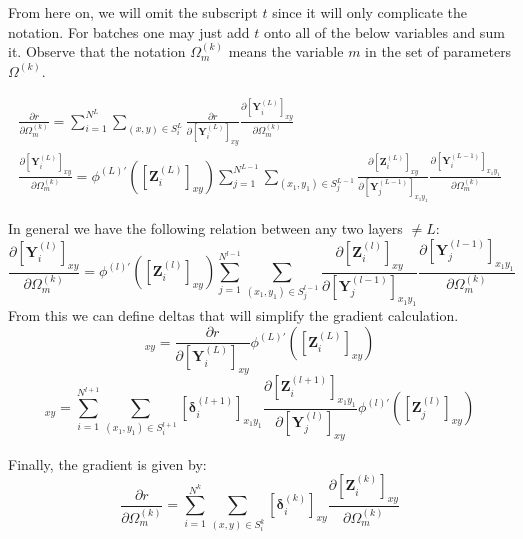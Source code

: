 \documentclass[a4paper,10pt]{article}
\theoremstyle{definition}
\begin{document}
From here on, we will omit the subscript $t$ since it will only complicate the notation. For batches one may just add $t$ onto all of the below variables and sum it. Observe that the notation $\Omega^{(k)}_m$ means the variable $m$ in the set of parameters $\Omega^{(k)}$.

\begin{gather}
\frac{\partial r}{\partial \Omega^{(k)}_m} = \sum_{i = 1}^{N^L}\sum_{(x,y) \in S^L_i} \frac{\partial r}{\partial [\pmb{Y}^{(L)}_i]_{xy}} \frac{\partial [\pmb{Y}^{(L)}_i]_{xy}}{\partial \Omega^{(k)}_m} \\
\frac{\partial [\pmb{Y}^{(L)}_i]_{xy}}{\partial \Omega^{(k)}_m} = \phi^{(L)'}([\pmb{Z}^{(L)}_{i}]_{xy}) \sum_{j = 1}^{N^{L-1}}\sum_{(x_1,y_1) \in S^{L-1}_j}\frac{\partial [\pmb{Z}^{(L)}_{i}]_{xy}}{\partial [\pmb{Y}^{(L-1)}_j]_{x_1y_1}}\frac{\partial [\pmb{Y}^{(L-1)}_i]_{x_1y_1}}{\partial \Omega^{(k)}_m}
\end{gather}

In general we have the following relation between any two layers $\neq L$:
\begin{equation}
\frac{\partial [\pmb{Y}^{(l)}_i]_{xy}}{\partial \Omega^{(k)}_m} = \phi^{(l)'}([\pmb{Z}^{(l)}_{i}]_{xy}) \sum_{j = 1}^{N^{l-1}}\sum_{(x_1,y_1) \in S^{l-1}_j}\frac{\partial [\pmb{Z}^{(l)}_{i}]_{xy}}{\partial [\pmb{Y}^{(l-1)}_j]_{x_1y_1}}\frac{\partial [\pmb{Y}^{(l-1)}_j]_{x_1y_1}}{\partial \Omega^{(k)}_m}
\end{equation}
From this we can define deltas that will simplify the gradient calculation.
\begin{equation}
[\pmb{\delta}_i^{(L)}]_{xy} = \frac{\partial r}{\partial [\pmb{Y}^{(L)}_i]_{xy}}\phi^{(L)'}([\pmb{Z}^{(L)}_{i}]_{xy})
\label{eq:fundamentalDeltaL}
\end{equation}
\begin{equation}
[\pmb{\delta}_j^{(l)}]_{xy} = \sum_{i = 1}^{N^{l+1}}\sum_{(x_1,y_1) \in S^{l+1}_i} [\pmb{\delta}^{(l+1)}_i]_{x_1y_1} \frac{\partial [\pmb{Z}^{(l + 1)}_{i}]_{x_1y_1}}{\partial [\pmb{Y}^{(l)}_j]_{xy}} \phi^{(l)'}([\pmb{Z}^{(l)}_{j}]_{xy})
\label{eq:fundamentalDelta}
\end{equation}

Finally, the gradient is given by:
\begin{equation}
\frac{\partial r}{\partial \Omega^{(k)}_m} = \sum_{i = 1}^{N^{k}}\sum_{(x,y) \in S^{k}_i} [\pmb{\delta}_i^{(k)}]_{xy} \frac{\partial [\pmb{Z}^{(k)}_i]_{xy}}{\partial \Omega^{(k)}_m}
\label{eq:fundamentalWeight}
\end{equation}
\end{document}
